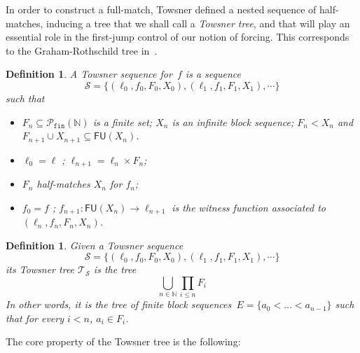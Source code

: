 \documentclass[10pt,a4paper]{article}
\def\Tc{\mathcal{T}}
\def\Sc{\mathcal{S}}
\newcommand{\NN}[0]{\mathbb{N}}
\newcommand{\Pfin}{\mathcal{P}_{\mathtt{fin}}}
\newcommand{\FU}[0]{\mathsf{FU}} %
\numberwithin{theorem}{section}
\newtheorem{definition}[theorem]{Definition}
\begin{document}
In order to construct a full-match, Towsner defined a nested sequence of half-matches, inducing a tree that we shall call a \emph{Towsner tree}, and that will play an essential role in the first-jump control of our notion of forcing. This corresponds to the Graham-Rothschild tree in~\cite{liu2026reverse}.

\begin{definition}
A \emph{Towsner sequence} for~$f$ is a sequence 
$$\Sc = \{ (\ell_0, f_0, F_0, X_0), (\ell_1, f_1, F_1, X_1), \cdots \}$$
such that 
\begin{itemize}
    \item[(1)] $F_n \subseteq \Pfin(\NN)$ is a finite set; $X_n$ is an infinite block sequence; $F_n < X_n$ and $F_{n+1} \cup X_{n+1} \subseteq \FU(X_n)$.
    \item[(2)] $\ell_0 = \ell$ ; $\ell_{n+1} = \ell_n \times F_n$;
    \item[(3)] $F_n$ half-matches $X_n$ for $f_n$;
    \item[(4)] $f_0 = f$ ; $f_{n+1} : \FU(X_n) \to \ell_{n+1}$ is the witness function associated to $(\ell_n, f_n, F_n, X_n)$.
\end{itemize}
\end{definition}

\begin{definition}
Given a Towsner sequence
$$\Sc = \{(\ell_0, f_0, F_0, X_0), (\ell_1, f_1, F_1, X_1), \cdots \}$$
its \emph{Towsner tree} $\Tc_{\Sc}$ is the tree
$$
\bigcup_{n \in \NN} \prod_{i \leq n} F_i
$$
In other words, it is the tree of finite block sequences~$E = \{ a_0 < \dots < a_{n-1} \}$ such that for every $i < n$, $a_i \in F_i$.
\end{definition}

The core property of the Towsner tree is the following:
\end{document}
